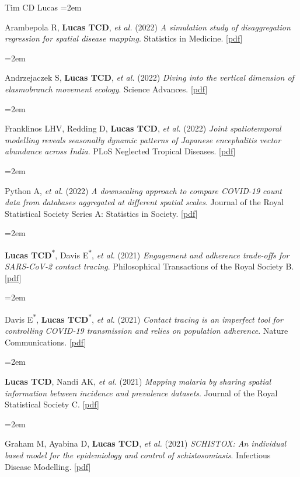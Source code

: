 \documentclass{scrartcl}
\newcommand{\MarginText}[1]{\marginpar{\raggedleft\itshape\small#1}} %
\newcommand{\Description}[1]{\hangindent=2em\hangafter=0\noindent\raggedright\footnotesize{#1}\par\normalsize\vspace{1em}} %
\begin{document}
\begin{cv}{Tim {\Large CD} Lucas}
\Description{Arambepola R, \textbf{Lucas TCD},  \emph{et al.} (2022) \emph{A simulation study of disaggregation regression for spatial disease mapping}. Statistics in Medicine. [\href{https://onlinelibrary.wiley.com/doi/full/10.1002/sim.9220}{pdf}]}



\Description{Andrzejaczek S, \textbf{Lucas TCD}, \emph{et al.} (2022) \emph{Diving into the vertical dimension of elasmobranch movement ecology}. Science Advances. [\href{https://www.science.org/doi/full/10.1126/sciadv.abo1754}{pdf}]}


\Description{Franklinos LHV, Redding D, \textbf{Lucas TCD},  \emph{et al.} (2022) \emph{Joint spatiotemporal modelling reveals seasonally dynamic patterns of Japanese encephalitis vector abundance across India}. PLoS Neglected Tropical Diseases. [\href{https://journals.plos.org/plosntds/article?id=10.1371/journal.pntd.0010218}{pdf}]}

\Description{Python A,  \emph{et al.} (2022) \emph{A downscaling approach to compare COVID-19 count data from databases aggregated at different spatial scales}. Journal of the Royal Statistical Society Series A: Statistics in Society. [\href{https://academic.oup.com/jrsssa/article/185/1/202/7068448}{pdf}]}




\Description{\MarginText{2021}\textbf{Lucas TCD}\textsuperscript{$\ast$}, Davis E\textsuperscript{$\ast$}, \emph{et al.} (2021) \emph{Engagement and adherence trade-offs for SARS-CoV-2 contact tracing}. Philosophical Transactions of the Royal Society B. [\href{https://royalsocietypublishing.org/doi/10.1098/rstb.2020.0270}{pdf}]}



\Description{Davis E\textsuperscript{$\ast$}, \textbf{Lucas TCD}\textsuperscript{$\ast$}, \emph{et al.} (2021) \emph{Contact tracing is an imperfect tool for controlling COVID-19 transmission and relies on population adherence}. Nature Communications. [\href{https://www.nature.com/articles/s41467-021-25531-5}{pdf}]}



\Description{\textbf{Lucas TCD}, Nandi AK,  \emph{et al.} (2021) \emph{Mapping malaria by sharing spatial information between incidence and prevalence datasets}. Journal of the Royal Statistical Society C. [\href{https://rss.onlinelibrary.wiley.com/doi/full/10.1111/rssc.12484}{pdf}]}



\Description{Graham M, Ayabina D, \textbf{Lucas TCD}, \emph{et al.} (2021) \emph{SCHISTOX: An individual based model for the epidemiology and control of schistosomiasis}. Infectious Disease Modelling. [\href{https://www.sciencedirect.com/science/article/pii/S2468042721000130}{pdf}]}



\end{cv}
\end{document}
